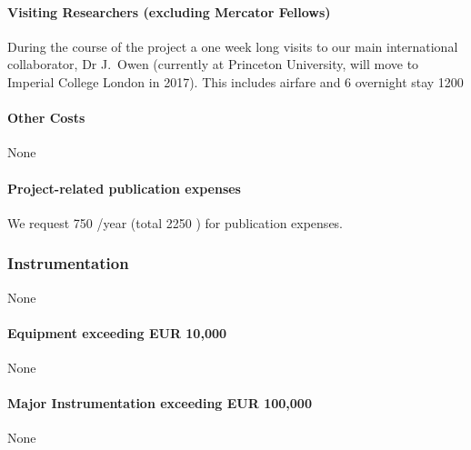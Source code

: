 \documentclass[10pt,fleqn,twoside]{article}
\begin{document}
\paragraph{Visiting Researchers (excluding Mercator Fellows)}

During the course of the project a one week long visits to our main
international collaborator, Dr J.~Owen (currently at Princeton
University, will move to Imperial College London in 2017).
This includes airfare and 6 overnight stay 1200 \EUR{}

\paragraph{Other Costs}

None

\paragraph{Project-related publication expenses}

We request 750 \EUR{}/year (total 2250 \EUR{}) for publication expenses.

\subsubsection{Instrumentation}

None

\paragraph{Equipment exceeding EUR 10,000} 

None

\paragraph{Major Instrumentation exceeding EUR 100,000} 

None 

% 
% 
% 
% 
% 
% 
% 
\end{document}
